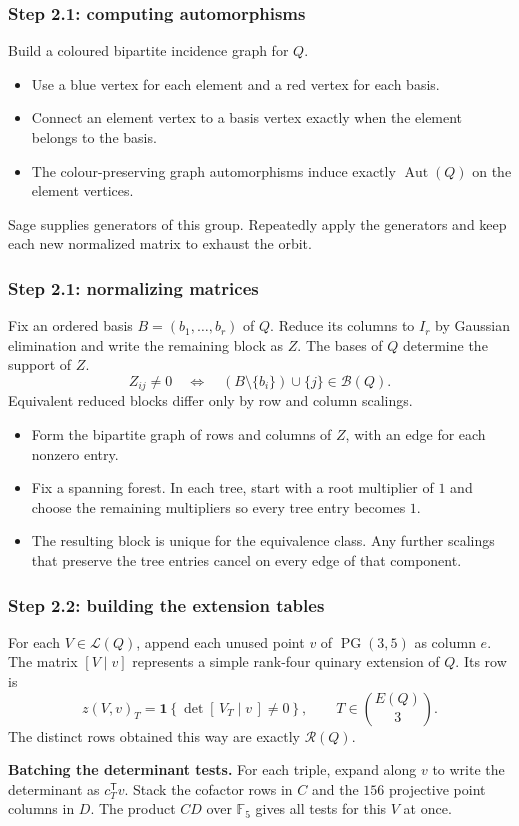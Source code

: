\documentclass{beamer}
\newcommand{\F}{\mathbb{F}}
\newcommand{\B}{\mathcal B}
\newcommand{\RR}{\mathcal R}
\newcommand{\PG}{\operatorname{PG}}
\newcommand{\Aut}{\operatorname{Aut}}
\begin{document}
\begin{frame}
  \frametitle{Step 2.1: computing automorphisms}
  Build a coloured bipartite incidence graph for $Q$.
  \begin{itemize}
    \item Use a blue vertex for each element and a red vertex for each
      basis.
    \item Connect an element vertex to a basis vertex exactly when the
      element belongs to the basis.
    \item The colour-preserving graph automorphisms induce exactly
      $\Aut(Q)$ on the element vertices.
  \end{itemize}
  Sage supplies generators of this group. Repeatedly apply the
  generators and keep each new normalized matrix to exhaust the orbit.
\end{frame}

\begin{frame}
  \frametitle{Step 2.1: normalizing matrices}
  Fix an ordered basis $B=(b_1,\ldots,b_r)$ of $Q$. Reduce its
  columns to $I_r$ by Gaussian elimination and write the remaining
  block as $Z$. The bases of $Q$ determine the support of $Z$.
  \[
    Z_{ij}\ne0
    \quad\Longleftrightarrow\quad
    (B\setminus\{b_i\})\cup\{j\}\in\B(Q).
  \]
  Equivalent reduced blocks differ only by row and column scalings.
  \begin{itemize}
    \item Form the bipartite graph of rows and columns of $Z$, with
      an edge for each nonzero entry.
    \item Fix a spanning forest. In each tree, start with a root
      multiplier of $1$ and choose the remaining multipliers so
      every tree entry becomes $1$.
    \item The resulting block is unique for the equivalence class.
      Any further scalings that preserve the tree entries cancel
      on every edge of that component.
  \end{itemize}
\end{frame}

\begin{frame}
  \frametitle{Step 2.2: building the extension tables}
  For each $V\in\mathcal L(Q)$, append each unused point $v$ of
  $\PG(3,5)$ as column $e$. The matrix $[V\mid v]$ represents a
  simple rank-four quinary extension of $Q$. Its row is
  \[
    z(V,v)_T=\mathbf 1\!\left\{\det[\,V_T\mid v\,]\ne 0\right\},
    \qquad T\in\binom{E(Q)}{3}.
  \]
  The distinct rows obtained this way are exactly $\RR(Q)$.

  \medskip
  \textbf{Batching the determinant tests.}
  For each triple, expand along $v$ to write the determinant as
  $c_T^{\mathsf T}v$. Stack the cofactor rows in $C$ and the $156$
  projective point columns in $D$. The product $CD$ over $\F_5$
  gives all tests for this $V$ at once.
\end{frame}
\end{document}
